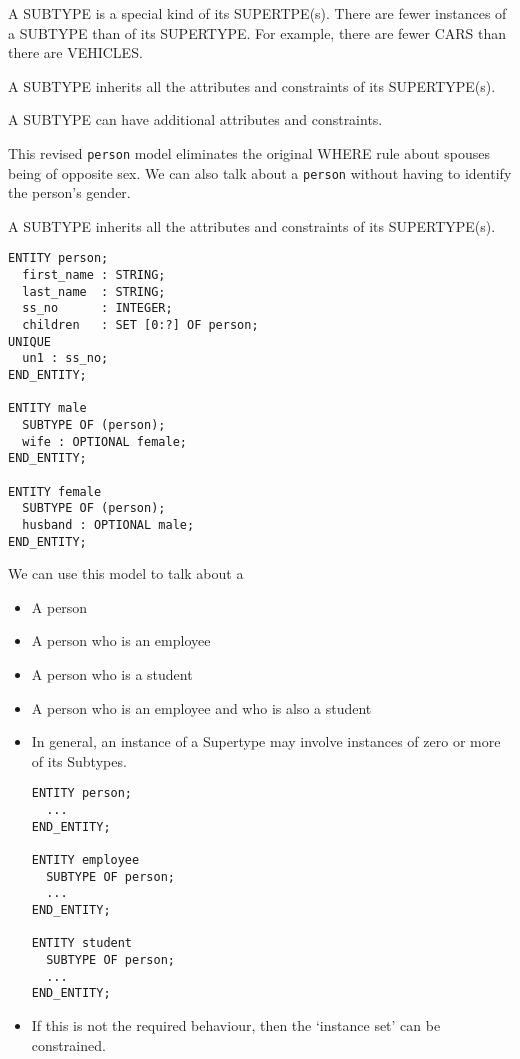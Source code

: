 \begin{remarks}
\remintro


    A SUBTYPE is a special kind of its SUPERTPE(s). There are fewer instances
of a SUBTYPE than of its SUPERTYPE. For example, there are fewer CARS than 
there are VEHICLES. 

    A SUBTYPE inherits all the attributes and constraints of its SUPERTYPE(s).

    A SUBTYPE can have additional attributes and constraints.

    This revised \texttt{person} model eliminates the original WHERE rule
about spouses being of opposite sex. We can also talk about a \texttt{person}
without having to identify the person's gender.

\remend
\end{remarks}


A SUBTYPE inherits all the attributes and constraints of its SUPERTYPE(s).
\begin{verbatim}
ENTITY person;
  first_name : STRING;
  last_name  : STRING;
  ss_no      : INTEGER;
  children   : SET [0:?] OF person;
UNIQUE
  un1 : ss_no;
END_ENTITY;

ENTITY male
  SUBTYPE OF (person);
  wife : OPTIONAL female;
END_ENTITY;

ENTITY female
  SUBTYPE OF (person);
  husband : OPTIONAL male;
END_ENTITY;
\end{verbatim}

\begin{remarks}
\remintro


We can use this model to talk about a 
\begin{itemize}
\item A person
\item A person who is an employee
\item A person who is a student
\item A person who is an employee and who is also a student
\end{itemize}

\remend
\end{remarks}


\begin{itemize}
\item In general, an instance of a Supertype may involve instances of zero or 
more of its Subtypes.
\begin{verbatim}
ENTITY person;
  ...
END_ENTITY;

ENTITY employee
  SUBTYPE OF person;
  ...
END_ENTITY;

ENTITY student
  SUBTYPE OF person;
  ...
END_ENTITY;
\end{verbatim}
\item If this is not the required behaviour, then the `instance set' can be
constrained.
\end{itemize}

